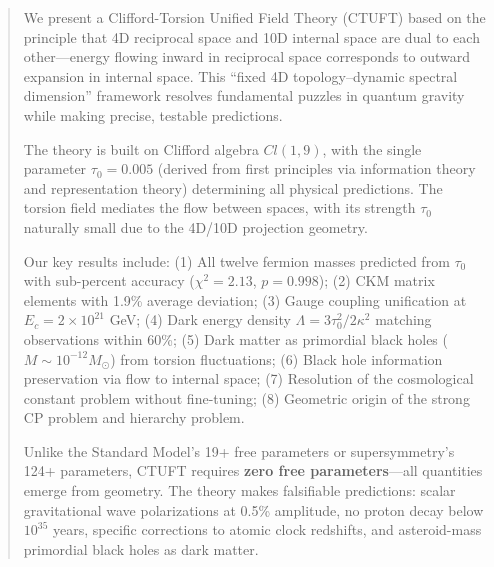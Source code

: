 \begin{abstract}

We present a Clifford-Torsion Unified Field Theory (CTUFT) based on the principle that 4D reciprocal space and 10D internal space are dual to each other—energy flowing inward in reciprocal space corresponds to outward expansion in internal space. This ``fixed 4D topology--dynamic spectral dimension'' framework resolves fundamental puzzles in quantum gravity while making precise, testable predictions.

The theory is built on Clifford algebra $Cl(1,9)$, with the single parameter $\tau_0 = 0.005$ (derived from first principles via information theory and representation theory) determining all physical predictions. The torsion field mediates the flow between spaces, with its strength $\tau_0$ naturally small due to the 4D/10D projection geometry.

Our key results include: (1) All twelve fermion masses predicted from $\tau_0$ with sub-percent accuracy ($\chi^2 = 2.13$, $p = 0.998$); (2) CKM matrix elements with 1.9\% average deviation; (3) Gauge coupling unification at $E_c = 2\times 10^{21}$ GeV; (4) Dark energy density $\Lambda = 3\tau_0^2/2\kappa^2$ matching observations within 60\%; (5) Dark matter as primordial black holes ($M \sim 10^{-12} M_\odot$) from torsion fluctuations; (6) Black hole information preservation via flow to internal space; (7) Resolution of the cosmological constant problem without fine-tuning; (8) Geometric origin of the strong CP problem and hierarchy problem.

Unlike the Standard Model's 19+ free parameters or supersymmetry's 124+ parameters, CTUFT requires \textbf{zero free parameters}—all quantities emerge from geometry. The theory makes falsifiable predictions: scalar gravitational wave polarizations at 0.5\% amplitude, no proton decay below $10^{35}$ years, specific corrections to atomic clock redshifts, and asteroid-mass primordial black holes as dark matter.

\end{abstract}

\maketitle

\tableofcontents
\newpage
